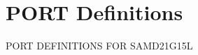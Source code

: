 \hypertarget{group___s_a_m_d21_g15_l__port}{}\section{P\+O\+RT Definitions}
\label{group___s_a_m_d21_g15_l__port}
P\+O\+RT D\+E\+F\+I\+N\+I\+T\+I\+O\+NS F\+OR S\+A\+M\+D21\+G15L 